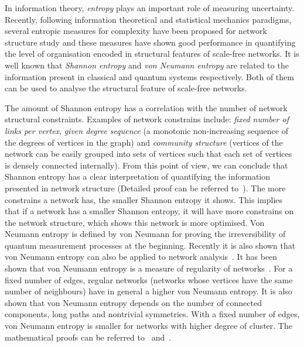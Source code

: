 \documentclass[conference]{IEEEtran}
\begin{document}
In information theory, \emph{entropy} plays an important role of measuring uncertainty. Recently, following information theoretical and statistical mechanics paradigms, several entropic measures for complexity have been proposed for network structure study and these measures have shown good performance in quantifying the level of organisation encoded in structural features of scale-free networks. It is well known that \emph{Shannon entropy} and \emph{von Neumann entropy} are related to the information present in classical and quantum systems respectively. Both of them can be used to analyse the structural feature of scale-free networks\cite{anand2009entropy}. 

The amount of Shannon entropy has a correlation with the number of network structural constraints. Examples of network constrains include: \emph{fixed number of links per vertex}, \emph{given degree sequence} (a monotonic non-increasing sequence of the degrees of vertices in the graph) and \emph{community structure} (vertices of the network can be easily grouped into sets of vertices such that each set of vertices is densely connected internally). From this point of view, we can conclude that Shannon entropy has a clear interpretation of quantifying the information presented in network structure (Detailed proof can be referred to~\cite{anand2009entropy}). The more constrains a network has, the smaller Shannon entropy it shows. This implies that if a network has a smaller Shannon entropy, it will have more constrains on the network structure, which shows this network is more optimised. Von Neumann entropy is defined by von Neumann for proving the irreversibility of quantum measurement processes at the beginning. Recently it is also shown that von Neumann entropy can also be applied to network analysis~\cite{passerini2008neumann}. It has been shown that von Neumann entropy is a measure of regularity of networks~\cite{passerini2008neumann}. For a fixed number of edges, regular networks (networks whose vertices have the same number of neighbours) have in general a higher von Neumann entropy. It is also shown that von Neumann entropy depends on the number of connected components, long paths and nontrivial symmetries. With a fixed number of edges, von Neumann entropy is smaller for networks with higher degree of cluster. The mathematical proofs can be referred to~\cite{passerini2008neumann} and~\cite{anand2009entropy}.
\end{document}
